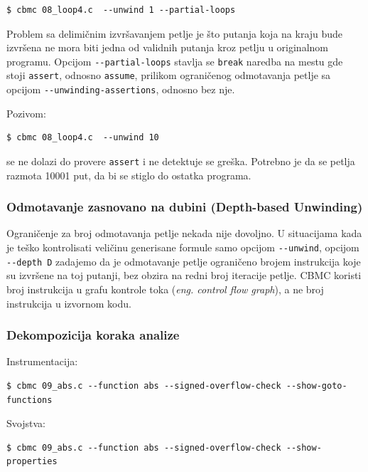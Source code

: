 \begin{verbatim}
$ cbmc 08_loop4.c  --unwind 1 --partial-loops
\end{verbatim}

Problem sa delimičnim izvršavanjem petlje je što putanja koja na kraju bude izvršena ne mora biti jedna od validnih putanja kroz petlju u originalnom programu. Opcijom \texttt{-{}-partial-loops} stavlja se \texttt{break} naredba na mestu gde stoji \texttt{assert}, odnosno \texttt{assume}, prilikom ograničenog odmotavanja petlje sa opcijom \texttt{-{}-unwinding-assertions}, odnosno bez nje.

Pozivom:

\begin{verbatim}
$ cbmc 08_loop4.c  --unwind 10
\end{verbatim}

se ne dolazi do provere \texttt{assert} i ne detektuje se greška. Potrebno je da se petlja razmota 10001 put, da bi se stiglo do ostatka programa.

\subsubsection{Odmotavanje zasnovano na dubini (Depth-based Unwinding)}\label{odmotavanje-zasnovano-na-dubini-depth-based-unwinding}

Ograničenje za broj odmotavanja petlje nekada nije dovoljno. U situacijama kada je teško kontrolisati veličinu generisane formule samo opcijom \texttt{-{}-unwind}, opcijom \texttt{-{}-depth\ D} zadajemo da je odmotavanje petlje ograničeno brojem instrukcija koje su izvršene na toj putanji, bez obzira na redni broj iteracije petlje. CBMC koristi broj instrukcija u grafu kontrole toka (\emph{eng. control flow graph}), a ne broj instrukcija u izvornom kodu.

\subsubsection{Dekompozicija koraka analize}\label{dekompozicija-koraka-analize}

Instrumentacija:

\begin{verbatim}
$ cbmc 09_abs.c --function abs --signed-overflow-check --show-goto-functions
\end{verbatim}

Svojstva:

\begin{verbatim}
$ cbmc 09_abs.c --function abs --signed-overflow-check --show-properties
\end{verbatim}

